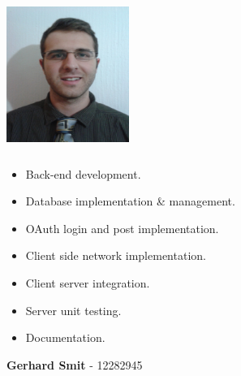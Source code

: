 \documentclass[letterpaper]{article}
\begin{document}
		\begin{minipage}[l]{0.23\textwidth}
			\begin{flushleft}
				\includegraphics[width=40mm,height=50mm]{Members/Martin.jpg}
			\end{flushleft}
		\end{minipage}
		\begin{minipage}[r]{0.75\textwidth}
			\begin{itemize}
				\item Back-end development.
				\item Database implementation \& management.
				\item OAuth login and post implementation.
				\item Client side network implementation.
				\item Client server integration.
				\item Server unit testing.
				\item Documentation.
			\end{itemize}
		\end{minipage}
		
		\newpage
		\begin{flushleft}
			\begin{Large}
				\textbf{Gerhard Smit} - 12282945 \\
			\end{Large}
		\end{flushleft}
				
\end{document}
